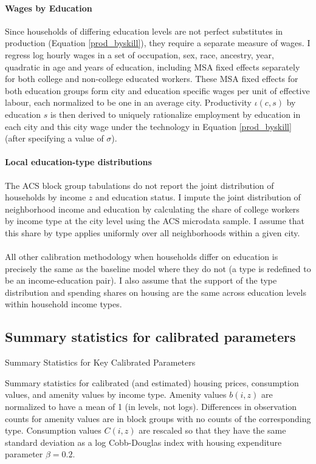 \documentclass[12pt]{article}
\begin{document}
	\paragraph*{Wages by Education} Since households of differing education levels are not perfect substitutes in production (Equation \ref{prod_byskill}), they require a separate measure of wages. I regress log hourly wages in a set of occupation, sex, race, ancestry, year, quadratic in age and years of education, including MSA fixed effects separately for both college and non-college educated workers. These MSA fixed effects for both education groups form city and education specific wages per unit of effective labour, each normalized to be one in an average city. Productivity $\iota(c, s)$ by education $s$ is then derived to uniquely rationalize employment by education in each city and this city wage under the technology in Equation \eqref{prod_byskill} (after specifying a value of $\sigma$).
	
	\paragraph*{Local education-type distributions} The ACS block group tabulations do not report the joint distribution of households by income $z$ and education status. I impute the joint distribution of neighborhood income and education by calculating the share of college workers by income type at the city level using the ACS microdata sample. I assume that this share by type applies uniformly over all neighborhoods within a given city. 
	
	\paragraph*{}
	All other calibration methodology when households differ on education is precisely the same as the baseline model where they do not (a type is redefined to be an income-education pair). I also assume that the support of the type distribution and spending shares on housing are the same across education levels within household income types. 
	
	
	
	\clearpage
	\subsection{Summary statistics for calibrated parameters}\label{Appendix:CalibPara}
	\begin{table}[htbp]
	\caption{Summary Statistics for Key Calibrated Parameters}\label{table:CalibPara}
	\makebox[\textwidth]{}
	\caption*{Summary statistics for calibrated (and estimated) housing prices, consumption values, and amenity values by income type. Amenity values $b(i, z)$ are normalized to have a mean of 1 (in levels, not logs). Differences in observation counts for amenity values are in block groups with no counts of the corresponding type. Consumption values $C(i, z)$ are rescaled so that they have the same standard deviation as a log Cobb-Douglas index with housing expenditure parameter $\beta = 0.2$.}
	\end{table}
	
\end{document}
